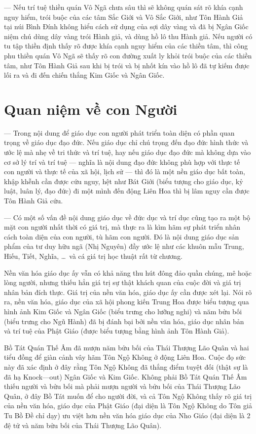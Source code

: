 --- Nếu trí tuệ thiền quán Vô Ngã chưa sâu thì sẽ không quán sát rõ khía cạnh nguy hiểm, trói buộc của các tâm Sắc Giới và Vô Sắc Giới, như Tôn Hành Giả tại núi Bình Đính không hiểu cách sử dụng của sợi dây vàng và đã bị Ngân Giốc niệm chú dùng dây vàng trói Hành giả, và dùng hồ lô thu Hành giả. Nếu người có tu tập thiền định thấy rõ được khía cạnh nguy hiểm của các thiền tâm, thì công phu thiền quán Vô Ngã sẽ thấy rõ con đường xuất ly khỏi trói buộc của các thiền tâm, như Tôn Hành Giả sau khi bị trói và bị nhốt kín vào hồ lô đã tự kiếm được lối ra và đi đến chiến thắng Kim Giốc và Ngân Giốc.

\section{Quan niệm về con Người} %
\label{sec:33_34_con_nguoi}

--- Trong nội dung để giáo dục con người phát triển toàn diện có phần quan trọng về giáo dục đạo đức. Nếu giáo dục chỉ chú trọng đến đạo đức hình thức và ước lệ mà nhẹ về tri thức và trí tuệ, hay nếu giáo dục đạo đức mà không dựa vào cơ sở lý trí và trí tuệ --- nghĩa là nội dung đạo đức không phù hợp với thực tế con người và thực tế của xã hội, lịch sử --- thì đó là một nền giáo dục bất toàn, khập khễnh cần được cứu nguy, hệt như Bát Giới (biểu tượng cho giáo dục, kỷ luật, luân lý, đạo đức) đi một mình đến động Liên Hoa thì bị lâm nguy cần được Tôn Hành Giả cứu.

--- Có một số vấn đề nội dung giáo dục về đức dục và trí dục cũng tạo ra một bộ mặt con người nhất thời có giá trị, mà thực ra là kìm hãm sự phát triển nhân cách toàn diện của con người, tù hãm con người. Đó là nội dung giáo dục sản phẩm của tư duy hữu ngã (Nhị Nguyên) đầy ước lệ như các khuôn mẫu Trung, Hiếu, Tiết, Nghĩa, \ldots ~và cá giá trị học thuật rất từ chương.

Nền văn hóa giáo dục ấy vẫn có khả năng thu hút đông đảo quần chúng, mê hoặc lòng người, nhưng thiếu hẳn giá trị sự thật khách quan của cuộc đời và giá trị nhân bản đích thực. Giá trị của nền văn hóa, giáo dục ấy cần được xét lại. Nói rõ ra, nền văn hóa, giáo dục của xã hội phong kiến Trung Hoa được biểu tượng qua hình ảnh Kim Giốc và Ngân Giốc (biểu trưng cho lưỡng nghi) và năm bửu bối (biểu trưng cho Ngũ Hành) đã bị đánh bại bởi nền văn hóa, giáo dục nhân bản và trí tuệ của Phật Giáo (được biểu tượng bằng hình ảnh Tôn Hành Giả).

Bồ Tát Quán Thế Âm đã mượn năm bửu bối của Thái Thượng Lão Quân và hai tiểu đồng để giàn cảnh vây hãm Tôn Ngộ Không ở động Liên Hoa. Cuộc đọ sức này đã xác định ở đây rằng Tôn Ngộ Không đã thắng điểm tuyệt đối (thật sự là đã hạ Knock---out) Ngân Giốc và Kim Giốc. Không phải Bồ Tát Quán Thế Âm thiếu người và bửu bối mà phải mượn người và bửu bối của Thái Thượng Lão Quân, ở đây Bồ Tát muốn để cho người đời, và cả Tôn Ngộ Không thấy rõ giá trị của nền văn hóa, giáo dục của Phật Giáo (đại diện là Tôn Ngộ Không do Tôn giả Tu Bồ Đề chỉ dạy) ưu việt hơn nền văn hóa giáo dục của Nho Giáo (đại diện là 2 đệ tử và năm bửu bối của Thái Thượng Lão Quân).

